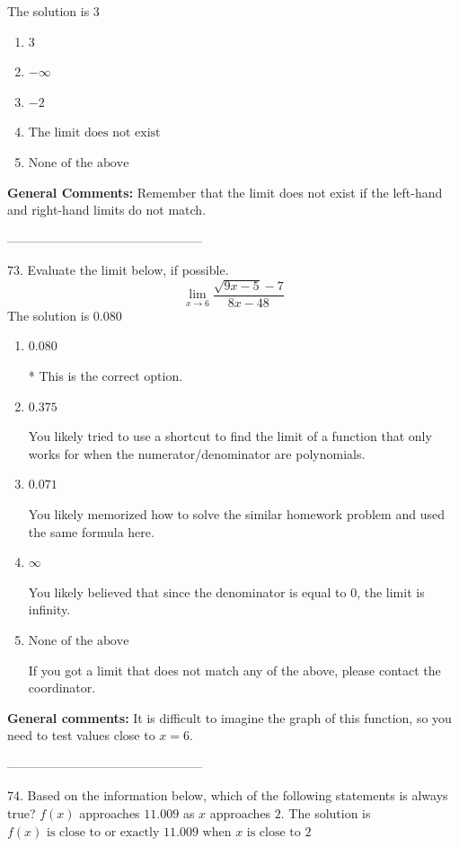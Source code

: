 \documentclass{extbook}[14pt]
\begin{document}
The solution is $ 3 $ 

\begin{enumerate}[label=\Alph*.] 
\item $ 3 $ 

  
\item $ -\infty $ 

  
\item $ -2 $ 

  
\item $ \text{The limit does not exist} $ 

  
\item $ \text{None of the above} $ 

  
\end{enumerate} 
 
\textbf{General Comments:} Remember that the limit does not exist if the left-hand and right-hand limits do not match.

-----------------------------------------------

73. Evaluate the limit below, if possible.
\[ \lim_{x \rightarrow 6} \frac{\sqrt{9x - 5} - 7}{8x - 48} \] 
The solution is $ 0.080 $ 

\begin{enumerate}[label=\Alph*.] 
\item $ 0.080 $ 

 * This is the correct option. 
\item $ 0.375 $ 

 You likely tried to use a shortcut to find the limit of a function that only works for when the numerator/denominator are polynomials. 
\item $ 0.071 $ 

 You likely memorized how to solve the similar homework problem and used the same formula here. 
\item $ \infty $ 

 You likely believed that since the denominator is equal to 0, the limit is infinity. 
\item $ \text{None of the above} $ 

 If you got a limit that does not match any of the above, please contact the coordinator. 
\end{enumerate} 
 
\textbf{General comments:} It is difficult to imagine the graph of this function, so you need to test values close to $x = 6$.

-----------------------------------------------

74. Based on the information below, which of the following statements is always true?
$f(x)$ approaches $11.009$ as $x$ approaches $2$. 
The solution is $ f(x) \text{ is close to or exactly } 11.009 \text{ when } x \text{ is close to } 2 $ 
\end{document}
